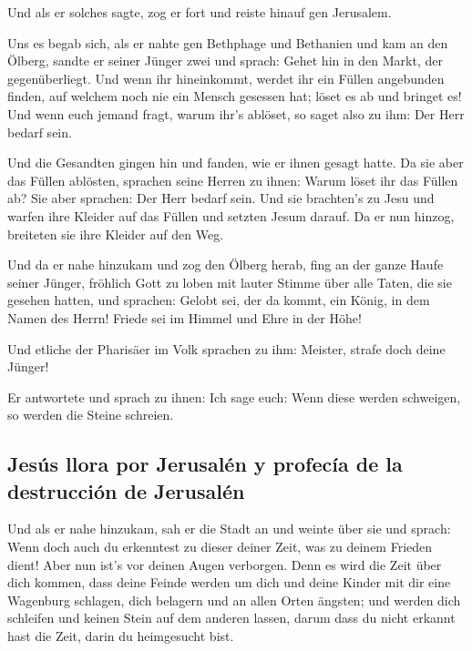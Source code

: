  Und als er solches sagte, zog er fort und reiste hinauf
gen Jerusalem.

 Uns es begab sich, als er nahte gen Bethphage und
Bethanien und kam an den Ölberg, sandte er seiner Jünger zwei
 und sprach: Gehet hin in den Markt, der gegenüberliegt.
Und wenn ihr hineinkommt, werdet ihr ein Füllen angebunden finden, auf
welchem noch nie ein Mensch gesessen hat; löset es ab und bringet es!
 Und wenn euch jemand fragt, warum ihr's ablöset, so
saget also zu ihm: Der Herr bedarf sein.

 Und die Gesandten gingen hin und fanden, wie er ihnen
gesagt hatte.  Da sie aber das Füllen ablösten, sprachen
seine Herren zu ihnen: Warum löset ihr das Füllen ab? 
Sie aber sprachen: Der Herr bedarf sein.  Und sie
brachten's zu Jesu und warfen ihre Kleider auf das Füllen und setzten
Jesum darauf.  Da er nun hinzog, breiteten sie ihre
Kleider auf den Weg.

 Und da er nahe hinzukam und zog den Ölberg herab, fing
an der ganze Haufe seiner Jünger, fröhlich Gott zu loben mit lauter
Stimme über alle Taten, die sie gesehen hatten,  und
sprachen: Gelobt sei, der da kommt, ein König, in dem Namen des Herrn!
Friede sei im Himmel und Ehre in der Höhe!

 Und etliche der Pharisäer im Volk sprachen zu ihm:
Meister, strafe doch deine Jünger!

 Er antwortete und sprach zu ihnen: Ich sage euch: Wenn
diese werden schweigen, so werden die Steine schreien.

\hypertarget{jesuxfas-llora-por-jerusaluxe9n-y-profecuxeda-de-la-destrucciuxf3n-de-jerusaluxe9n}{%
\subsection{Jesús llora por Jerusalén y profecía de la destrucción de
Jerusalén}\label{jesuxfas-llora-por-jerusaluxe9n-y-profecuxeda-de-la-destrucciuxf3n-de-jerusaluxe9n}}

 Und als er nahe hinzukam, sah er die Stadt an und weinte
über sie  und sprach: Wenn doch auch du erkenntest zu
dieser deiner Zeit, was zu deinem Frieden dient! Aber nun ist's vor
deinen Augen verborgen.  Denn es wird die Zeit über dich
kommen, dass deine Feinde werden um dich und deine Kinder mit dir eine
Wagenburg schlagen, dich belagern und an allen Orten ängsten;
 und werden dich schleifen und keinen Stein auf dem
anderen lassen, darum dass du nicht erkannt hast die Zeit, darin du
heimgesucht bist.

